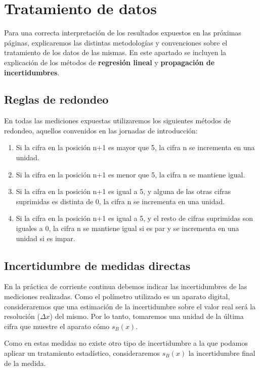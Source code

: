 \documentclass[12pt, a4paper, titlepage]{article}
\begin{document}
  \section{Tratamiento de datos}

  Para una correcta interpretación de los resultados expuestos en las próximas páginas, explicaremos las distintas metodologías y convenciones sobre el tratamiento de los datos de las mismas. En este apartado se incluyen la explicación de los métodos de \textbf{regresión lineal} y \textbf{propagación de incertidumbres}.

  \subsection{Reglas de redondeo}
  \label{sec:redondeo}

  En todas las mediciones expuestas utilizaremos los siguientes métodos de redondeo, aquellos convenidos en las jornadas de introducción:

  \begin{enumerate}
    \item Si la cifra en la posición n+1 es mayor que 5, la cifra n se incrementa en una unidad.
    \item Si la cifra en la posición n+1 es menor que 5, la cifra n se mantiene igual.
    \item Si la cifra en la posición n+1 es igual a 5, y alguna de las otras cifras suprimidas es distinta de 0, la cifra n se incrementa en una unidad.
    \item Si la cifra en la posición n+1 es igual a 5, y el resto de cifras suprimidas son iguales a 0, la cifra n se mantiene igual si es par y se incrementa en una unidad si es impar.
  \end{enumerate}

  \subsection{Incertidumbre de medidas directas}
  \label{sec:incert}

  En la práctica de corriente continua debemos indicar las incertidumbres de las mediciones realizadas. Como el polímetro utilizado es un aparato digital, consideraremos que una estimación de la incertidumbre sobre el valor real será la resolución ($\Delta x$) del mismo. Por lo tanto, tomaremos una unidad de la última cifra que muestre el aparato cómo $s_B (x)$.

  Como en estas medidas no existe otro tipo de incertidumbre a la que podamos aplicar un tratamiento estadístico, consideraremos $s_B (x)$ la incertidumbre final de la medida.
\end{document}
